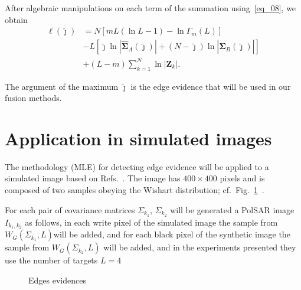 \documentclass[conference]{IEEEtran}
\begin{document}
After algebraic manipulations on each term of the summation using~\eqref{eq_08}, we obtain
\begin{align}\nonumber
	\ell(\widehat\jmath)&=N\left[mL(\ln{L}-1)-\ln{\Gamma_m(L)}\right]\\\nonumber
	&- L\left[\widehat\jmath\ln{|\mathbf{\widehat{\Sigma}}_{A}(\widehat\jmath)|} +(N-\widehat\jmath)\ln{|\mathbf{\widehat{\Sigma}}_{B}(\widehat\jmath)|}\right] \\
	&+ (L-m)\sum_{k=1}^{N}\ln{|\mathbf{Z}_{k}|}.\label{eq_09}
\end{align}

The argument of the maximum $\widehat{\jmath}$ is the edge evidence that will be used in our fusion methods.

\section{Application in simulated images}\label{sec_06}

The methodology (MLE) for detecting edge evidence will be applied to a simulated image based on Refs.~\cite{nhfc,gamf}. 
The image has $400\times400$ pixels and is composed of two samples obeying the Wishart distribution; cf.\ Fig.~\ref{fig_Edges-Evidence}~.

For each pair of covariance matrices $\Sigma_{k_1}$, $\Sigma_{k_2}$ will be generated a PolSAR image $I_{k_1,k_2}$ as follows, in each write pixel of the simulated image the sample from  $W_G(\Sigma_{k_1}, L)$will be added,  and for each black pixel of the synthetic image the sample from $W_G(\Sigma_{k_2},L)$ will be added, and in the experiments presented they use the number of targets $L=4$

\begin{figure}[hbt]
    \caption{Edges evidences}
     \label{fig_Edges-Evidence}
\end{figure}
\end{document}
